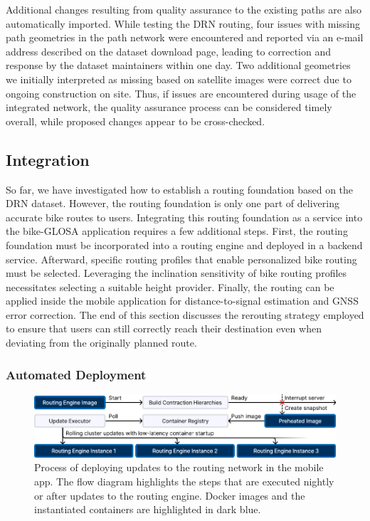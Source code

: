 Additional changes resulting from quality assurance to the existing paths are also automatically imported. While testing the DRN routing, four issues with missing path geometries in the path network were encountered and reported via an e-mail address described on the dataset download page, leading to correction and response by the dataset maintainers within one day. Two additional geometries we initially interpreted as missing based on satellite images were correct due to ongoing construction on site. Thus, if issues are encountered during usage of the integrated network, the quality assurance process can be considered timely overall, while proposed changes appear to be cross-checked.

\subsection{Integration}

So far, we have investigated how to establish a routing foundation based on the DRN dataset. However, the routing foundation is only one part of delivering accurate bike routes to users. Integrating this routing foundation as a service into the bike-GLOSA application requires a few additional steps. First, the routing foundation must be incorporated into a routing engine and deployed in a backend service. Afterward, specific routing profiles that enable personalized bike routing must be selected. Leveraging the inclination sensitivity of bike routing profiles necessitates selecting a suitable height provider. Finally, the routing can be applied inside the mobile application for distance-to-signal estimation and GNSS error correction. The end of this section discusses the rerouting strategy employed to ensure that users can still correctly reach their destination even when deviating from the originally planned route.

\subsubsection{Automated Deployment}

\begin{figure}[t]
\centering
\includegraphics[width=\linewidth]{images/load-distribution-containerization-preheating.pdf}
\caption{Process of deploying updates to the routing network in the mobile app. The flow diagram highlights the steps that are executed nightly or after updates to the routing engine. Docker images and the instantiated containers are highlighted in dark blue.}
\label{fig:multi-stage-continuous-deployment}
\end{figure}

